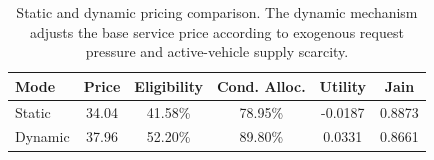 \begin{table}[t]
\centering
\caption{Static and dynamic pricing comparison. The dynamic mechanism adjusts the base service price according to exogenous request pressure and active-vehicle supply scarcity.}
\label{tab:c25_pricing}
\begin{tabular}{lccccc}
\hline
Mode & Price & Eligibility & Cond. Alloc. & Utility & Jain \\
\hline
Static & 34.04 & 41.58\% & 78.95\% & -0.0187 & 0.8873 \\
Dynamic & 37.96 & 52.20\% & 89.80\% & 0.0331 & 0.8661 \\
\hline
\end{tabular}
\end{table}
